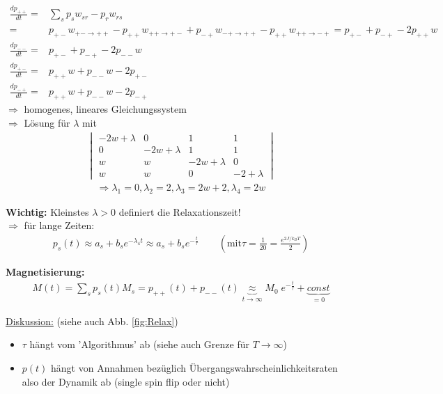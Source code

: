 \documentclass[12pt]{article}
\begin{document}
  \begin{align*}
 \frac{dp_{++}}{dt} =& \sum_s p_s w_{s r} - p_{r} w_{r s} \\
 =& p_{+-} w_{+- \rightarrow ++} - p_{++} w_{++ \rightarrow +-} +
 p_{-+} w_{-+ \rightarrow ++} - p_{++} w_{++ \rightarrow -+} =
 p_{+-} + p_{-+} - 2 p_{++} w \\
 \frac{dp_{--}}{dt}= & p_{+-} + p_{-+} - 2p_{--}w \\
  \frac{dp_{+-}}{dt}= & p_{++}w + p_{--} w- 2p_{+-} \\
   \frac{dp_{-+}}{dt}= & p_{++}w + p_{--}w -2p_{-+}
 \end{align*}
$\Rightarrow$ homogenes, lineares Gleichungssystem \\
$\Rightarrow$ Lösung für $\lambda$ mit 
\begin{align*}
\begin{vmatrix}
-2w+\lambda & 0 & 1 & 1 \\
0 & -2w +\lambda & 1 & 1 \\
w & w & -2w + \lambda & 0 \\
w & w & 0 & -2+\lambda 
\end{vmatrix} 
\end{align*}
\begin{align*}
\Rightarrow \lambda_1=0, \lambda_2=2, \lambda_3=2w+2, \lambda_4=2w \end{align*}

\textbf{Wichtig:} Kleinstes $\lambda >0$ definiert die Relaxationszeit! \\
$\Rightarrow$ für lange Zeiten: 
\begin{align*} p_s(t) \approx a_s + b_s e^{-\lambda_4 t} \approx a_s + b_s e^{-\frac{t}{\tau}} \quad \quad \left(\text{mit} \tau= \frac{1}{20}= \frac{e^{2J/k_BT}}{2} \right)
\end{align*}

\textbf{Magnetisierung:} 
\begin{align}
M(t)= \sum_s p_s(t) M_s = p_{++}(t) + p_{--}(t) \underbrace{\approx}_{t \to \infty} M_0 \; e^{-\frac{t}{\tau}} + \underbrace{const}_{=0}
\end{align}


\underline{Diskussion:}  (siehe auch Abb. \ref{fig:Relax})
\begin{itemize}
\item $\tau$ hängt vom 'Algorithmus' ab (siehe auch Grenze für $T\to \infty $)
\item $p(t)$ hängt von Annahmen bezüglich Übergangswahrscheinlichkeitsraten  also der Dynamik ab (single spin flip oder nicht)
\end{itemize}
\end{document}
